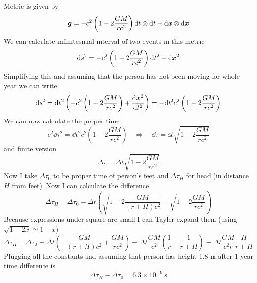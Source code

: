 Metric is given by
%
\begin{equation}
    \boldsymbol{g} = - c^2 \left(1-2\frac{GM}{rc^2}\right) \dd t \otimes \dd t  + \dd \boldsymbol{x} \otimes \dd \boldsymbol{x}
\end{equation}
%
We can calculate infinitesimal interval of two events in this metric
%
\begin{equation}
    \dd s^2 = - c^2 \left(1-2\frac{GM}{rc^2}\right) \dd t^2 + \dd \boldsymbol{x}^2
\end{equation}
%
Simplifying this and assuming that the person has not been moving for whole year
we can write
%
\begin{equation}
    \dd s^2 = \dd t^2 \left(- c^2 \left(1-2\frac{GM}{rc^2}\right)  +
    \frac{\dd \boldsymbol{x}^2}{\dd t^2}\right) =
    - \dd t^2c^2 \left(1-2\frac{GM}{rc^2}\right)
\end{equation}
%
We can now calculate the proper time
%
\begin{equation}
    c^2 \dd \tau^2 = \dd t^2c^2 \left(1-2\frac{GM}{rc^2}\right)
    \quad \Rightarrow \quad
    \dd \tau = \dd t \sqrt{1-2\frac{GM}{rc^2}}
\end{equation}
%
and finite version
%
\begin{equation}
    \Delta \tau = \Delta t \sqrt{1-2\frac{GM}{rc^2}}
\end{equation}
%
Now I take $\Delta \tau_{0}$ to be proper time of person's feet and
$\Delta \tau_{H}$ for head (in distance $H$ from feet). Now I can calculate the
difference
%
\begin{equation}
    \Delta \tau_{H} - \Delta \tau_{0} =
    \Delta t \left(\sqrt{1-2\frac{GM}{(r+H)c^2}} - \sqrt{1-2\frac{GM}{rc^2}}\right)
\end{equation}
%
Because expressions under square are small I can Taylor expand them (using
$\sqrt{1-2x} \simeq 1 -x$)
%
\begin{equation}
    \Delta \tau_{H} - \Delta \tau_{0} =
    \Delta t \left(-\frac{GM}{(r+H)c^2} + \frac{GM}{rc^2} \right) =
    \Delta t \frac{GM}{c^2} \left(\frac{1}{r} - \frac{1}{r+H}\right) =
    \Delta t \frac{GM}{c^2r} \frac{H}{r+H}
\end{equation}
%
Plugging all the constants and assuming that person has height 1.8 m
after 1 year time difference is
%
\begin{equation}
    \Delta \tau_{H} - \Delta \tau_{0} = 6.3 \times 10^{-9}~\text{s}
\end{equation}

